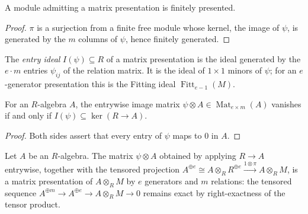 \begin{lemma}
  \label{mk-lem:matrix_presentation_fp}
  \leanok

  A module admitting a matrix presentation is finitely presented.
\end{lemma}

\begin{proof}
  \leanok
  \(\pi\) is a surjection from a finite free module whose kernel, the image
  of \(\psi\), is generated by the \(m\) columns of \(\psi\), hence finitely
  generated.
\end{proof}

\begin{definition}
  \label{mk-def:entry_ideal}
  \leanok

  The \emph{entry ideal} \(I(\psi) \subseteq R\) of a matrix presentation is
  the ideal generated by the \(e \cdot m\) entries \(\psi_{ij}\) of the
  relation matrix.  It is the ideal of \(1 \times 1\) minors of \(\psi\);
  for an \(e\)-generator presentation this is the Fitting ideal
  \(\operatorname{Fitt}_{e-1}(M)\).
\end{definition}

\begin{lemma}
  \label{mk-lem:entry_ideal_vanish}
  \leanok

  For an \(R\)-algebra \(A\), the entrywise image matrix
  \(\psi \otimes A \in \operatorname{Mat}_{e \times m}(A)\) vanishes if and
  only if \(I(\psi) \subseteq \ker(R \to A)\).
\end{lemma}

\begin{proof}
  \leanok
  Both sides assert that every entry of \(\psi\) maps to \(0\) in \(A\).
\end{proof}

\begin{definition}
  \label{mk-def:matrix_presentation_base_change}
  \leanok

  Let \(A\) be an \(R\)-algebra.  The matrix \(\psi \otimes A\) obtained by
  applying \(R \to A\) entrywise, together with the tensored projection
  \(A^{\oplus e} \cong A \otimes_R R^{\oplus e}
    \xrightarrow{1 \otimes \pi} A \otimes_R M\),
  is a matrix presentation of \(A \otimes_R M\) by \(e\) generators and
  \(m\) relations: the tensored sequence
  \(A^{\oplus m} \to A^{\oplus e} \to A \otimes_R M \to 0\) remains exact by
  right-exactness of the tensor product.
\end{definition}

